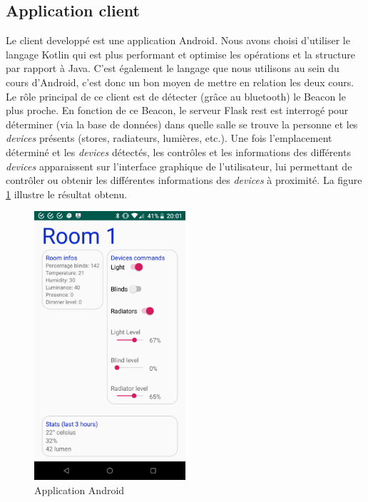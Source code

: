 \subsection{Application client}
Le client developpé est une application Android. Nous avons choisi d'utiliser le langage Kotlin qui est plus performant et optimise les opérations et la structure par rapport à Java. C'est également le langage que nous utilisons au sein du cours d'Android, c'est donc un bon moyen de mettre en relation les deux cours.
Le rôle principal de ce client est de détecter (grâce au bluetooth) le Beacon le plus proche. En fonction de ce Beacon, le serveur Flask \acrshort{rest} est interrogé pour déterminer (via la base de données) dans quelle salle se trouve la personne et les \textit{devices} présents (stores, radiateurs, lumières, etc.). Une fois l'emplacement déterminé et les \textit{devices} détectés, les contrôles et les informations des différents \textit{devices} apparaissent sur l'interface graphique de l'utilisateur, lui permettant de contrôler ou obtenir les différentes informations des \textit{devices} à proximité. La figure \ref{app_android} illustre le résultat obtenu.
\begin{figure}
    \begin{center}
        \includegraphics[width=0.5\textwidth]{img/app.png}
    \end{center}
    \caption{Application Android}
    \label{app_android}
\end{figure}

